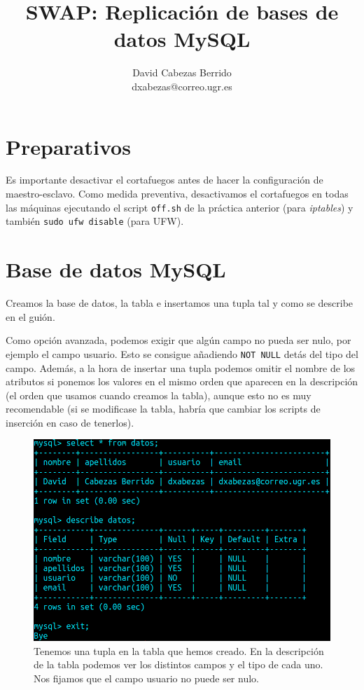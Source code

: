 \documentclass{article}
\title{\Huge SWAP: Replicación de bases de datos MySQL\vspace{10mm}}
\author{\huge David Cabezas Berrido \vspace{10mm} \\ 
  \huge dxabezas@correo.ugr.es \vspace{10mm}}
\begin{document}
\maketitle
\tableofcontents
\newpage

\section{Preparativos}

Es importante desactivar el cortafuegos antes de hacer la configuración de maestro-esclavo. Como medida preventiva, desactivamos el 
cortafuegos en
todas las máquinas ejecutando el script \texttt{off.sh} de la práctica anterior (para \emph{iptables}) y también \verb|sudo ufw disable| (para UFW).

\section{Base de datos MySQL}

Creamos la base de datos, la tabla e insertamos una tupla tal y como se describe en el guión.

Como opción avanzada, podemos exigir que algún campo no pueda ser nulo, por ejemplo el campo usuario. Esto se consigue
añadiendo \texttt{NOT NULL} detás del tipo del campo. Además, a la hora de insertar una tupla podemos omitir el nombre de los atributos si
 ponemos los valores en el mismo orden que aparecen en la descripción (el orden que usamos cuando creamos la tabla), aunque esto
 no es muy recomendable (si se modificase la tabla, habría que cambiar los scripts de inserción en caso de tenerlos).
 
\begin{figure}[H]
	\centering
	\includegraphics[width=120mm]{imgs/mydb}
	\caption{Tenemos una tupla en la tabla que hemos creado. En la descripción de la tabla podemos ver los distintos
	campos y el tipo de cada uno. Nos fijamos que el campo usuario no puede ser nulo.}
	\label{fig:mydb}
\end{figure}
\end{document}
